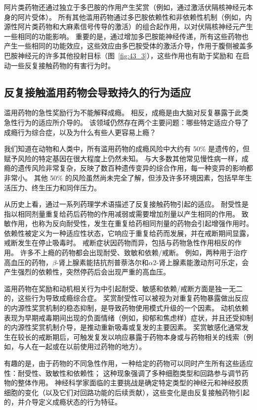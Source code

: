 阿片类药物还通过独立于多巴胺的作用产生奖赏（例如，通过激活伏隔核神经元本身的阿片受体）。
所有其他滥用药物通过多巴胺依赖性和非依赖性机制（例如，内源性阿片类药物和大麻素信号传导的激活）的组合起作用，以对伏隔核神经元产生一些相同的功能影响。
重要的是，通过增加多巴胺能神经传递，所有这些药物也产生一些相同的功能效应，这些效应由多巴胺受体的激活介导，作用于腹侧被盖多巴胺神经元的许多其他投射目标（图~\ref{fig:43_3}），这些作用也有助于奖励和 在启动一些反复接触药物的有害行为时。



\subsection{反复接触滥用药物会导致持久的行为适应}

滥用药物的急性奖励行为不能解释成瘾。
相反，成瘾是由大脑对反复暴露于此类急性行为的适应所介导的。
该领域仍然存在两个主要问题：哪些特定适应介导了成瘾行为综合症，以及为什么有些人更容易上瘾？


我们知道在动物和人类中，所有滥用药物的成瘾风险中大约有 50\% 是遗传的，但赋予风险的特定基因在很大程度上仍然未知。
与大多数其他常见慢性病一样，成瘾的遗传风险非常复杂，反映了数百种遗传变异的综合作用，每一种变异的影响都非常小。
其他 50\% 的风险虽然尚未完全了解，但涉及许多环境因素，包括早年生活压力、终生压力和同伴压力。


从历史上看，通过一系列药理学术语描述了反复接触药物引起的适应。
耐受性是指以相同剂量重复给药后药物的作用减弱或需要增加剂量以产生相同的作用。
致敏作用，也称为反向耐受性，发生在重复给药相同剂量的药物会引起增强作用时。
依赖性被定义为一种适应性状态，它响应于重复给药而发展，并在戒断期间显露，戒断发生在停止吸毒时。
戒断症状因药物而异，包括与药物急性作用相反的作用。
许多不上瘾的药物都会出现耐受、致敏和依赖/戒断。
例如，两种用于治疗高血压的药物，$ \beta $-肾上腺素能拮抗剂普萘洛尔和$ \alpha $2-肾上腺素能激动剂可乐定，会产生强烈的依赖性，突然停药后会出现严重的高血压。


滥用药物在奖励和动机相关行为中引起耐受、敏感和依赖/戒断方面是独一无二的，这些行为导致成瘾综合症。
奖赏耐受性可以被视为对重复药物暴露做出反应的内源性奖赏机制的稳态抑制，是导致药物使用模式升级的一个因素。
动机依赖表现为早期戒毒期间出现的负面情绪（例如，抑郁和焦虑样）症状，并且还受抑制的内源性奖赏机制介导，是推动重新吸毒或复发的主要因素。
奖赏敏感化通常发生在较长的戒断期后，可触发复发以响应暴露于药物本身或与药物相关的线索（例如，与人在一起或在以前使用过药物的地方）。


有趣的是，由于药物的不同急性作用，一种给定的药物可以同时产生所有这些适应性：耐受性、致敏性和依赖性； 
这种现象强调了多种细胞类型和回路参与调节药物的整体作用。
神经科学家面临的主要挑战是确定特定类型的神经元和神经胶质细胞的变化（以及它们对回路功能的后续贡献），这些变化是由反复接触药物引起的，并介导定义成瘾状态的行为特征。



